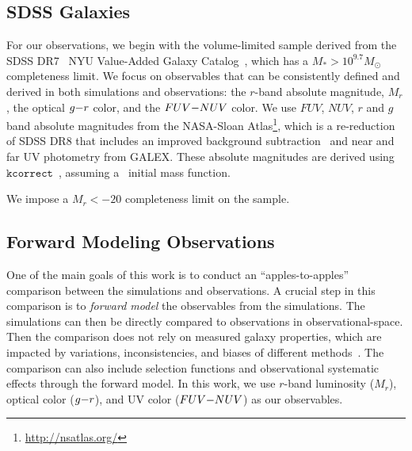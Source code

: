 \subsection{SDSS Galaxies} \label{sec:obs} 
For our observations, we 
begin with the volume-limited \cite{tinker2011} sample derived from the SDSS
DR7~\citep{abazajian2009} NYU Value-Added Galaxy
Catalog~\citep[VAGC;][]{blanton2005}, which has a $M_* > 10^{9.7} M_\odot$
completeness limit. 
We focus on observables that can be consistently defined and derived in both simulations 
and observations: the $r$-band absolute magnitude, $M_r$, the optical $g{-}r$
color, and the $FUV{-}NUV$ color. 
We use $FUV$, $NUV$, $r$ and $g$ band absolute magnitudes from the NASA-Sloan
Atlas\footnote{\url{http://nsatlas.org/}}, which is a re-reduction of SDSS DR8
\citep{aihara2011} that includes an improved background subtraction~\citep{blanton2011} 
and near and far UV photometry from GALEX. These absolute magnitudes are
derived using $\mathtt{kcorrect}$~\citep{blanton2007a}, assuming
a~\cite{chabrier2003} initial mass function. 

We impose a $M_r < -20$ completeness limit on the \cite{tinker2011} sample.

\subsection{Forward Modeling Observations} \label{sec:fm} 
One of the main goals of this work is to conduct an ``apples-to-apples''
comparison between the simulations and observations. 
A crucial step in this comparison is to \emph{forward model} the
observables from the simulations. 
The simulations can then be directly compared to observations in
observational-space. 
Then the comparison does not rely on measured galaxy properties,
which are impacted by variations, inconsistencies, and biases of different
methods~\citep{dickey2020}. 
The comparison can also include selection functions and observational systematic
effects through the forward model. 
In this work, we use $r$-band luminosity ($M_r$), optical color ($g{-}r$),
and UV color ($FUV{-}NUV$) as our observables. 

